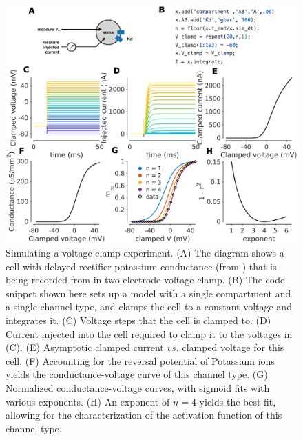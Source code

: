 \documentclass{frontiersSCNS} %
\begin{document}
\begin{figure}[!htb]
	\centering
	\includegraphics[width=1.0\linewidth]{gfx/figure_clamp}
	\caption{Simulating a voltage-clamp experiment. (A) The diagram shows a cell with delayed rectifier potassium conductance (from \cite{liuModelNeuronActivityDependent1998}) that is being recorded from in two-electrode voltage clamp. (B) The code snippet shown here sets up a model with a single compartment and a single channel type, and clamps the cell to a constant voltage and integrates it. (C) Voltage steps that the cell is clamped to. (D) Current injected into the cell required to clamp it to the voltages in (C). (E) Asymptotic clamped current $vs.$ clamped voltage for this cell. (F) Accounting for the reversal potential of Potassium ions yields the conductance-voltage curve of this channel type. (G) Normalized conductance-voltage curves, with sigmoid fits with various exponents. (H) An exponent of $n=4$ yields the best fit, allowing for the characterization of the activation function of this channel type. }
	\label{fig:figureclamp}
\end{figure}
\end{document}
